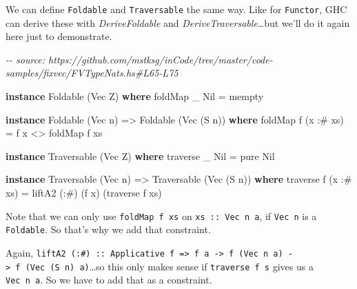 \documentclass[]{article}
\newenvironment{Shaded}{}{}
\newcommand{\CommentTok}[1]{\textcolor[rgb]{0.38,0.63,0.69}{\textit{#1}}}
\newcommand{\DataTypeTok}[1]{\textcolor[rgb]{0.56,0.13,0.00}{#1}}
\newcommand{\FunctionTok}[1]{\textcolor[rgb]{0.02,0.16,0.49}{#1}}
\newcommand{\KeywordTok}[1]{\textcolor[rgb]{0.00,0.44,0.13}{\textbf{#1}}}
\newcommand{\NormalTok}[1]{#1}
\newcommand{\OperatorTok}[1]{\textcolor[rgb]{0.40,0.40,0.40}{#1}}
\newcommand{\OtherTok}[1]{\textcolor[rgb]{0.00,0.44,0.13}{#1}}
\begin{document}
We can define \texttt{Foldable} and \texttt{Traversable} the same way. Like for
\texttt{Functor}, GHC can derive these with \emph{DeriveFoldable} and
\emph{DeriveTraversable}\ldots but we'll do it again here just to demonstrate.

\begin{Shaded}
\begin{Highlighting}[]
\CommentTok{{-}{-} source: https://github.com/mstksg/inCode/tree/master/code{-}samples/fixvec/FVTypeNats.hs\#L65{-}L75}

\KeywordTok{instance} \DataTypeTok{Foldable}\NormalTok{ (}\DataTypeTok{Vec} \DataTypeTok{Z}\NormalTok{) }\KeywordTok{where}
    \FunctionTok{foldMap}\NormalTok{ \_ }\DataTypeTok{Nil} \OtherTok{=} \FunctionTok{mempty}

\KeywordTok{instance} \DataTypeTok{Foldable}\NormalTok{ (}\DataTypeTok{Vec}\NormalTok{ n) }\OtherTok{=>} \DataTypeTok{Foldable}\NormalTok{ (}\DataTypeTok{Vec}\NormalTok{ (}\DataTypeTok{S}\NormalTok{ n)) }\KeywordTok{where}
    \FunctionTok{foldMap}\NormalTok{ f (x }\OperatorTok{:\#}\NormalTok{ xs) }\OtherTok{=}\NormalTok{ f x }\OperatorTok{<>} \FunctionTok{foldMap}\NormalTok{ f xs}

\KeywordTok{instance} \DataTypeTok{Traversable}\NormalTok{ (}\DataTypeTok{Vec} \DataTypeTok{Z}\NormalTok{) }\KeywordTok{where}
    \FunctionTok{traverse}\NormalTok{ \_ }\DataTypeTok{Nil} \OtherTok{=} \FunctionTok{pure} \DataTypeTok{Nil}

\KeywordTok{instance} \DataTypeTok{Traversable}\NormalTok{ (}\DataTypeTok{Vec}\NormalTok{ n) }\OtherTok{=>} \DataTypeTok{Traversable}\NormalTok{ (}\DataTypeTok{Vec}\NormalTok{ (}\DataTypeTok{S}\NormalTok{ n)) }\KeywordTok{where}
    \FunctionTok{traverse}\NormalTok{ f (x }\OperatorTok{:\#}\NormalTok{ xs) }\OtherTok{=}\NormalTok{ liftA2 (}\OperatorTok{:\#}\NormalTok{) (f x) (}\FunctionTok{traverse}\NormalTok{ f xs)}
\end{Highlighting}
\end{Shaded}

Note that we can only use \texttt{foldMap\ f\ xs} on \texttt{xs\ ::\ Vec\ n\ a},
if \texttt{Vec\ n} is a \texttt{Foldable}. So that's why we add that constraint.

Again,
\texttt{liftA2\ (:\#)\ ::\ Applicative\ f\ =\textgreater{}\ f\ a\ -\textgreater{}\ f\ (Vec\ n\ a)\ -\textgreater{}\ f\ (Vec\ (S\ n)\ a)}\ldots so
this only makes sense if \texttt{traverse\ f\ s} gives us a \texttt{Vec\ n\ a}.
So we have to add that as a constraint.
\end{document}
